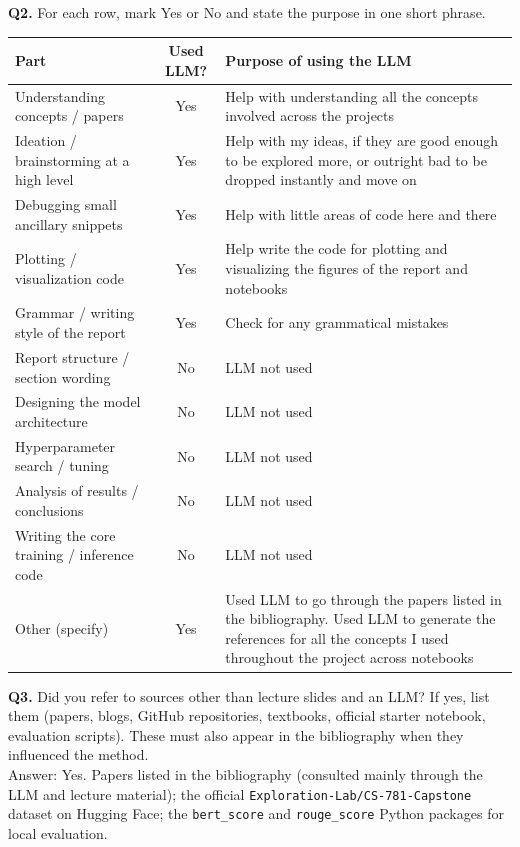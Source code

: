\documentclass[11pt, oneside]{article}
\begin{document}
\medskip
\noindent
\textbf{Q2.} For each row, mark Yes or No and state the purpose in one short phrase.
\begin{table}[H]
\centering
\begin{tabular}{>{\raggedright\arraybackslash}p{4.6cm}|c|>{\raggedright\arraybackslash}p{7.2cm}}
\toprule
Part & Used LLM? & Purpose of using the LLM \\
\midrule
Understanding concepts / papers & Yes &  Help with understanding all the concepts involved across the projects \\
Ideation / brainstorming at a high level & Yes & Help with my ideas, if they are good enough to be explored more, or outright bad to be dropped instantly and move on \\
Debugging small ancillary snippets & Yes & Help with little areas of code here and there \\
Plotting / visualization code & Yes & Help write the code for plotting and visualizing the figures of the report and notebooks \\
Grammar / writing style of the report & Yes & Check for any grammatical mistakes \\
Report structure / section wording & No &  LLM not used \\
Designing the model architecture & No & LLM not used \\
Hyperparameter search / tuning & No &  LLM not used \\
Analysis of results / conclusions & No & LLM not used \\
Writing the core training / inference code & No &  LLM not used \\
Other (specify) & Yes & Used LLM to go through the papers listed in the bibliography. Used LLM to generate the references for all the concepts I used throughout the project across notebooks \\
\bottomrule
\end{tabular}
\end{table}

\medskip
\noindent
\textbf{Q3.} Did you refer to sources other than lecture slides and an LLM?
If yes, list them (papers, blogs, GitHub repositories, textbooks, official starter notebook, evaluation scripts). These must also appear in the bibliography when they influenced the method. \\[0.4em]
Answer:
Yes. Papers listed in the bibliography (consulted mainly through the LLM and lecture material); the official \texttt{Exploration-Lab/CS-781-Capstone} dataset on Hugging Face; the \texttt{bert\_score} and \texttt{rouge\_score} Python packages for local evaluation.
\end{document}
